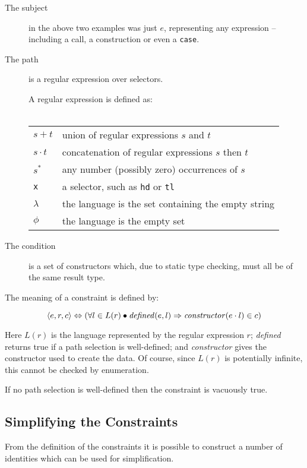 \documentclass[preprint]{sigplanconf}
\newcommand{\T}[1]{\texttt{#1}}
\newcommand{\tup}[1]{\ensuremath{\langle #1 \rangle}}
\newcommand{\K}{\ensuremath{^\ast}} %
\newcommand{\D}{\ensuremath{\cdot}} %
\begin{document}
\begin{description}
\item[The subject] in the above two examples was just $e$,
representing any expression -- including a call, a construction or
even a \T{case}.

\item[The path] is a regular expression over selectors.

A regular expression is defined as:\\ \\
\begin{tabular}{ll}
$s+t$ & union of regular expressions $s$ and $t$ \\
$s\D t$ & concatenation of regular expressions $s$ then $t$ \\
$s\K$  & any number (possibly zero) occurrences of $s$ \\
\T{x} & a selector, such as \T{hd} or \T{tl} \\
$\lambda$ & the language is the set containing the empty string \\
$\phi$ & the language is the empty set
\end{tabular}

\item[The condition] is a set of constructors which, due to static type
checking, must all be of the same result type.
\end{description}

The meaning of a constraint is defined by:

\[ \tup{e,r,c} \Leftrightarrow (\forall l \in L(r) \bullet
\text{\textit{defined}}(e,l) \Rightarrow
\text{\textit{constructor}}(e\D{}l) \in c )
\]

\noindent Here $L(r)$ is the language represented by the regular
expression $r$; \textit{defined} returns true if a path selection is
well-defined; and \textit{constructor} gives the constructor used to
create the data. Of course, since $L(r)$ is potentially infinite,
this cannot be checked by enumeration.

If no path selection is well-defined then the constraint is
vacuously true.

\subsection{Simplifying the Constraints}
\label{sec:constraint_simplify}

From the definition of the constraints it is possible to construct a
number of identities which can be used for simplification.
\end{document}
